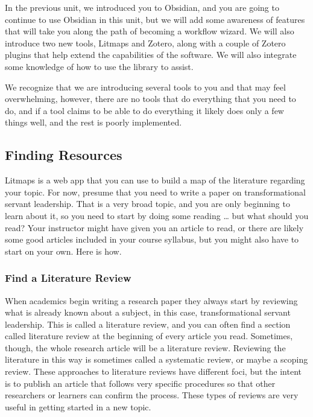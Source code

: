 \documentclass[
  letterpaper,
  DIV=11,
  numbers=noendperiod]{scrreprt}
\begin{document}
In the previous unit, we introduced you to Obsidian, and you are going
to continue to use Obsidian in this unit, but we will add some awareness
of features that will take you along the path of becoming a workflow
wizard. We will also introduce two new tools, Litmaps and Zotero, along
with a couple of Zotero plugins that help extend the capabilities of the
software. We will also integrate some knowledge of how to use the
library to assist.

We recognize that we are introducing several tools to you and that may
feel overwhelming, however, there are no tools that do everything that
you need to do, and if a tool claims to be able to do everything it
likely does only a few things well, and the rest is poorly implemented.

\subsection*{Finding Resources}\label{finding-resources}

Litmaps is a web app that you can use to build a map of the literature
regarding your topic. For now, presume that you need to write a paper on
transformational servant leadership. That is a very broad topic, and you
are only beginning to learn about it, so you need to start by doing some
reading \ldots{} but what should you read? Your instructor might have
given you an article to read, or there are likely some good articles
included in your course syllabus, but you might also have to start on
your own. Here is how.

\subsubsection*{Find a Literature
Review}\label{find-a-literature-review}

When academics begin writing a research paper they always start by
reviewing what is already known about a subject, in this case,
transformational servant leadership. This is called a literature review,
and you can often find a section called literature review at the
beginning of every article you read. Sometimes, though, the whole
research article will be a literature review. Reviewing the literature
in this way is sometimes called a systematic review, or maybe a scoping
review. These approaches to literature reviews have different foci, but
the intent is to publish an article that follows very specific
procedures so that other researchers or learners can confirm the
process. These types of reviews are very useful in getting started in a
new topic.
\end{document}

